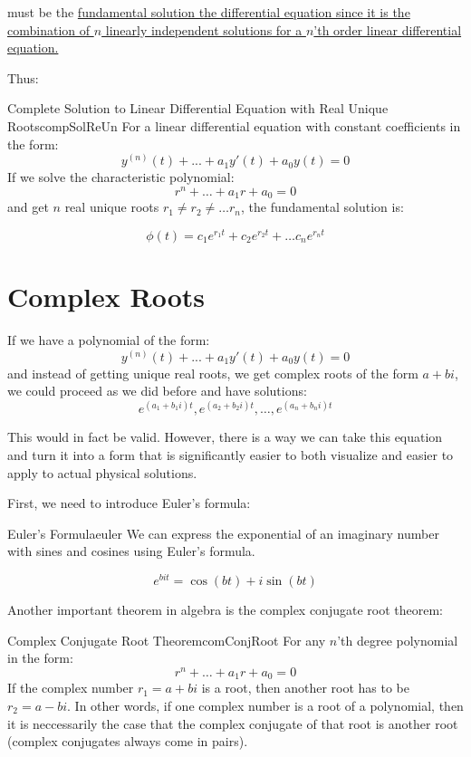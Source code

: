 \documentclass{report}
\begin{document}
must be the \hyperref[th:EqLinInd]{fundamental solution the differential equation since it is the combination of $n$ linearly independent solutions for a $n$'th order linear differential equation.}

Thus:

\begin{mytheo}{Complete Solution to Linear Differential Equation with Real Unique Roots}{compSolReUn}
    For a linear differential equation with constant coefficients in the form:
    $$y^{(n)}(t) + ... + a_1y'(t) + a_0y(t) = 0$$
    If we solve the characteristic polynomial:
    $$r^n+\dots+a_1r+a_0=0$$
    and get $n$ real unique roots $r_1 \neq r_2 \neq \dots r_n$, the fundamental solution is:
    
    $$\phi(t) = c_1e^{r_1t}+c_2e^{r_2t}+\dots c_ne^{r_nt}$$

\end{mytheo}


\section{Complex Roots}
\label{sec:comRoot}
If we have a polynomial of the form:
$$y^{(n)}(t) + ... + a_1y'(t) + a_0y(t) = 0$$
and instead of getting unique real roots, we get complex roots of the form $a+bi$, we could proceed as we did before and have solutions:
$$e^{(a_1+b_1i)t}, e^{(a_2+b_2i)t}, \dots, e^{(a_n+b_ni)t}$$

This would in fact be valid. However, there is a way we can take this equation and turn it into a form that is significantly easier to both visualize and easier to apply to actual physical solutions.

First, we need to introduce Euler's formula:

\begin{mytheo}{Euler's Formula}{euler}
    We can express the exponential of an imaginary number with sines and cosines using Euler's formula.
    
    $$e^{bit} = \cos(bt) + i\sin(bt)$$
\end{mytheo}

Another important theorem in algebra is the complex conjugate root theorem:

\begin{mytheo}{Complex Conjugate Root Theorem}{comConjRoot}
    For any $n$'th degree polynomial in the form:
    $$r^n+\dots+a_1r+a_0=0$$
    If the complex number $r_1=a+bi$ is a root, then another root has to be $r_2 = a-bi$. 
    In other words, if one complex number is a root of a polynomial, then it is neccessarily the case that the complex conjugate of that root is another root (complex conjugates always come in pairs).
\end{mytheo}
\end{document}

